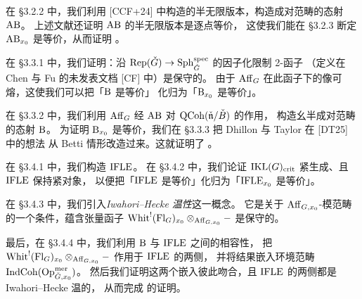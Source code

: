 在 §3.2.2 中，我们利用 [CCF+24] 中构造的半无限版本，构造成对范畴的态射 $\mathrm{AB}$。
上述文献还证明 $\mathrm{AB}$ 的半无限版本是逐点等价，
这使我们能在 §3.2.3 断定 $\mathrm{AB}_{x_0}$ 是等价，从而证明 。

在 §3.3.1 中，我们证明：沿 $\mathrm{Rep}(\check{G})\to\mathrm{Sph}^{\mathrm{spec}}_{\check{G}}$ 的因子化限制 2-函子
（定义在 Chen 与 Fu 的未发表文档 [CF] 中）是保守的。
由于 $\mathrm{Aff}_G$ 在此函子下的像可熔，这使我们可以把「$\mathrm{B}$ 是等价」
化归为「$\mathrm{B}_{x_0}$ 是等价」。

在 §3.3.2 中，我们利用 $\mathrm{Aff}_G$ 经 $\mathrm{AB}$ 对 $\mathrm{QCoh}(\check{\mathfrak{n}}/\check{B})$ 的作用，
构造幺半成对范畴的态射 $\mathrm{B}$。
为证明 $\mathrm{B}_{x_0}$ 是等价，我们在 §3.3.3 把 Dhillon 与 Taylor 在 [DT25] 中的想法
从 Betti 情形改造过来。这就证明了 。

在 §3.4.1 中，我们构造 $\mathrm{IFLE}$。
在 §3.4.2 中，我们论证 $\mathrm{IKL}(G)_{\mathrm{crit}}$ 紧生成、且 $\mathrm{IFLE}$ 保持紧对象，
以便把「$\mathrm{IFLE}$ 是等价」化归为「$\mathrm{IFLE}_{x_0}$ 是等价」。

在 §3.4.3 中，我们引入\emph{Iwahori–Hecke 温性}这一概念。
它是关于 $\mathrm{Aff}_{G,x_0}$-模范畴的一个条件，蕴含张量函子
$\mathrm{Whit}^{!}(\mathrm{Fl}_G)_{x_0}\otimes_{\mathrm{Aff}_{G,x_0}}-$ 是保守的。

最后，在 §3.4.4 中，我们利用 $\mathrm{B}$ 与 $\mathrm{IFLE}$ 之间的相容性，
把 $\mathrm{Whit}^{!}(\mathrm{Fl}_G)_{x_0}\otimes_{\mathrm{Aff}_{G,x_0}}-$ 作用于 $\mathrm{IFLE}$ 的两侧，
并将结果嵌入环境范畴 $\mathrm{IndCoh}(\mathrm{Op}^{\mathrm{mer}}_{\check{G},x_0})$。
然后我们证明这两个嵌入彼此吻合，且 $\mathrm{IFLE}$ 的两侧都是 Iwahori–Hecke 温的，
从而完成  的证明。

